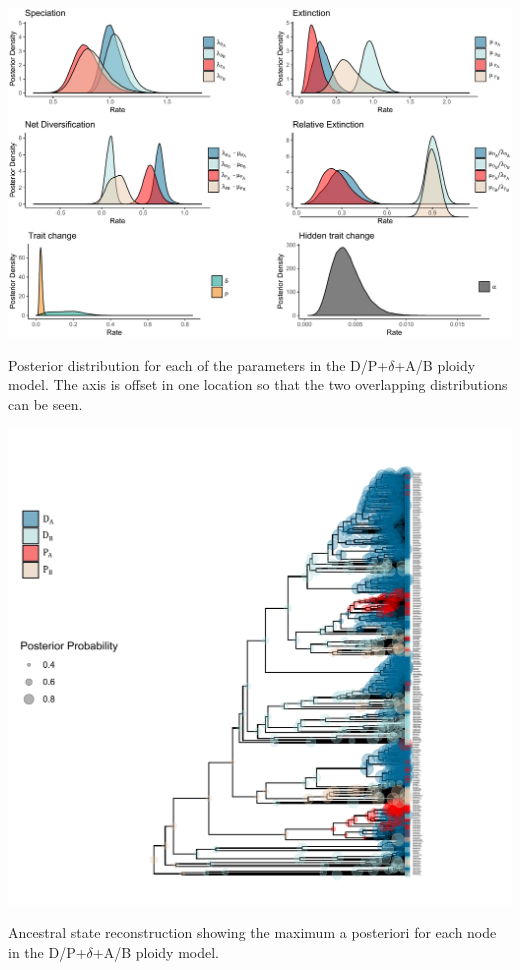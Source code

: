 \begin{suppfigure}
\includegraphics[width=\textwidth]{hisseDPposteriordist.pdf}
\caption{Posterior distribution for each of the parameters in the D/P+$\delta$+A/B ploidy model.  The axis is offset in one location so that the two overlapping distributions can be seen.} %
\label{suppfigure:DPAB}
\end{suppfigure}

\begin{suppfigure}
\includegraphics[width=\textwidth]{asrDPABdelta.pdf}
\caption{Ancestral state reconstruction showing the maximum a posteriori for each node in the D/P+$\delta$+A/B ploidy model.} %
\label{suppfigure:DPABasr}
\end{suppfigure}


